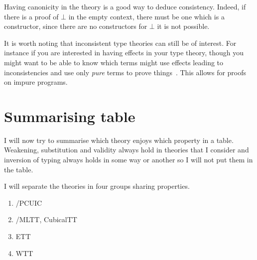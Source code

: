 Having canonicity in the theory is a good way to deduce consistency.
Indeed, if there is a proof of \(\bot\) in the empty context, there must be
one which is a constructor, since there are no constructors for \(\bot\)
it is not possible.

It is worth noting that inconsistent type theories can still be of interest.
For instance if you are interested in having effects in your type theory,
though you might want to be able to know which terms might use effects leading
to inconsistencies and use only \emph{pure} terms to prove
things~.
This allows for proofs on impure programs.

\section{Summarising table}

I will now try to summarise which theory enjoys which property in a table.
Weakening, substitution and validity always hold in theories that I consider and
inversion of typing always holds in some way or another so I will not put them
in the table.

I will separate the theories in four groups sharing properties.
\begin{enumerate}[label=(\Alph*)]
  \item \label{item:coq} \Coq/\acrlong{PCUIC}
  \item \label{item:agda} \Agda/\acrlong{MLTT}, \acrlong{CubicalTT}
  \item \label{item:ett} \acrlong{ETT}
  \item \label{item:wtt} \acrlong{WTT}
\end{enumerate}

\begingroup

